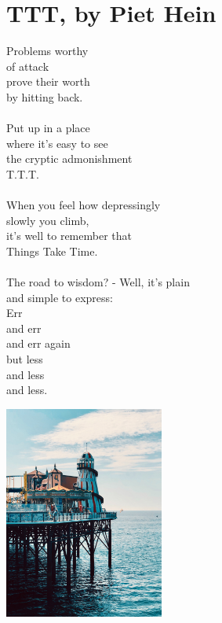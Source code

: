 \section{TTT, by Piet Hein}
Problems worthy \\
of attack \\
prove their worth \\
by hitting back. \\
\\
Put up in a place \\
where it's easy to see \\
the cryptic admonishment\\
    T.T.T. \\
\\
When you feel how depressingly \\
slowly you climb, \\
it's well to remember that\\
Things Take Time. \\
\\
The road to wisdom? - Well, it's plain\\
and simple to express: \\
   Err \\
   and err \\
   and err again \\ 
   but less \\
   and less \\
   and less. \\

\begin{center}
    \includegraphics[width=\linewidth,height=7cm]{brighton.jpeg}
\end{center}
